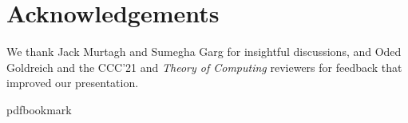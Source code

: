 \documentclass[11pt]{article}
\numberwithin{equation}{section}
\theoremstyle{definition}
\theoremstyle{plain}
\begin{document}
\section{Acknowledgements}
We thank Jack Murtagh and Sumegha Garg for insightful discussions, and 
Oded Goldreich and the CCC'21 and \emph{Theory of Computing} reviewers
for feedback that improved our presentation.



\newcommand{\prelim}{Preliminary version in\ }\newcommand{\prelims}{Preliminary
  versions in\ }
\providecommand{\bibhead}[1]{}
\expandafter\ifx\csname pdfbookmark\endcsname\relax%
  \providecommand{\tocrefpdfbookmark}{}
\else\providecommand{\tocrefpdfbookmark}{%
   \hypertarget{tocreferences}{}%
   \pdfbookmark[1]{References}{tocreferences}}%
\fi
\end{document}
